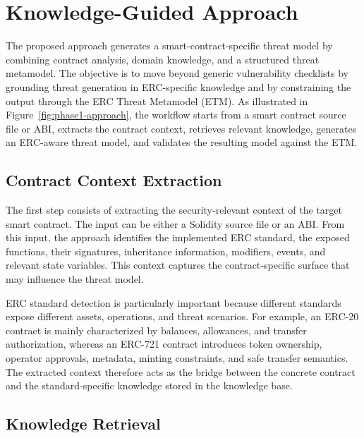 \section{Knowledge-Guided Approach}
\label{sec:knowledge-guided-approach}

The proposed approach generates a smart-contract-specific threat model by combining contract analysis, domain knowledge, and a structured threat metamodel. The objective is to move beyond generic vulnerability checklists by grounding threat generation in ERC-specific knowledge and by constraining the output through the ERC Threat Metamodel (ETM). As illustrated in Figure~\ref{fig:phase1-approach}, the workflow starts from a smart contract source file or ABI, extracts the contract context, retrieves relevant knowledge, generates an ERC-aware threat model, and validates the resulting model against the ETM.



\subsection{Contract Context Extraction}
\label{subsec:contract-context-extraction}

The first step consists of extracting the security-relevant context of the target smart contract. The input can be either a Solidity source file or an ABI. From this input, the approach identifies the implemented ERC standard, the exposed functions, their signatures, inheritance information, modifiers, events, and relevant state variables. This context captures the contract-specific surface that may influence the threat model.

ERC standard detection is particularly important because different standards expose different assets, operations, and threat scenarios. For example, an ERC-20 contract is mainly characterized by balances, allowances, and transfer authorization, whereas an ERC-721 contract introduces token ownership, operator approvals, metadata, minting constraints, and safe transfer semantics. The extracted context therefore acts as the bridge between the concrete contract and the standard-specific knowledge stored in the knowledge base.

\subsection{Knowledge Retrieval}
\label{subsec:knowledge-retrieval}

